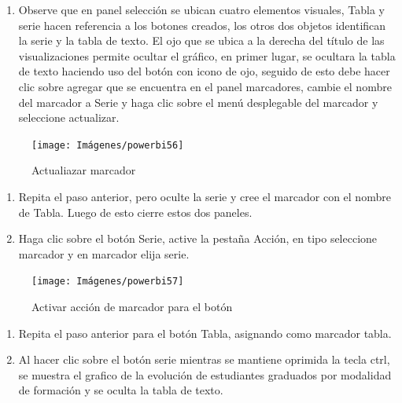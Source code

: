 \documentclass[
]{book}
\providecommand{\tightlist}{%
  \setlength{\itemsep}{0pt}\setlength{\parskip}{0pt}}
\begin{document}
\begin{enumerate}
\def\labelenumi{\arabic{enumi}.}
\setcounter{enumi}{8}
\tightlist
\item
  Observe que en panel selección se ubican cuatro elementos visuales, Tabla y serie hacen referencia a los botones creados, los otros dos objetos identifican la serie y la tabla de texto. El ojo que se ubica a la derecha del título de las visualizaciones permite ocultar el gráfico, en primer lugar, se ocultara la tabla de texto haciendo uso del botón con icono de ojo, seguido de esto debe hacer clic sobre agregar que se encuentra en el panel marcadores, cambie el nombre del marcador a Serie y haga clic sobre el menú desplegable del marcador y seleccione actualizar.
\end{enumerate}

\begin{figure}

{\centering \texttt{[image: Imágenes/powerbi56]} 

}

\caption{Actualiazar marcador}\label{fig:paso9alternancia-fig}
\end{figure}

\begin{enumerate}
\def\labelenumi{\arabic{enumi}.}
\setcounter{enumi}{9}
\item
  Repita el paso anterior, pero oculte la serie y cree el marcador con el nombre de Tabla. Luego de esto cierre estos dos paneles.
\item
  Haga clic sobre el botón Serie, active la pestaña Acción, en tipo seleccione marcador y en marcador elija serie.
\end{enumerate}

\begin{figure}

{\centering \texttt{[image: Imágenes/powerbi57]} 

}

\caption{Activar acción de marcador para el botón}\label{fig:paso11alternancia-fig}
\end{figure}

\begin{enumerate}
\def\labelenumi{\arabic{enumi}.}
\setcounter{enumi}{11}
\item
  Repita el paso anterior para el botón Tabla, asignando como marcador tabla.
\item
  Al hacer clic sobre el botón serie mientras se mantiene oprimida la tecla ctrl, se muestra el grafico de la evolución de estudiantes graduados por modalidad de formación y se oculta la tabla de texto.
\end{enumerate}
\end{document}
